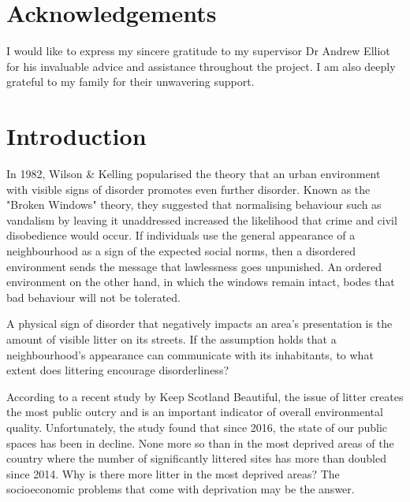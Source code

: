 \documentclass{thesis}
\begin{document}
\chapter*{Acknowledgements}

I would like to express my sincere gratitude to my supervisor Dr Andrew Elliot for his invaluable advice and assistance throughout the project. I am also deeply grateful to my family for their unwavering support.


\listoffigures
\listoftables


\tableofcontents


\chapter{Introduction}

In 1982, Wilson \& Kelling popularised the theory that an urban environment with visible signs of disorder promotes even further disorder. Known as the "Broken Windows" theory, they suggested that normalising behaviour such as vandalism by leaving it unaddressed increased the likelihood that crime and civil disobedience would occur\cite{broken-windows}. If individuals use the  general appearance of a neighbourhood as a sign of the expected social norms, then a disordered environment sends the message that lawlessness goes unpunished. An ordered environment on the other hand, in which the windows remain intact, bodes that bad behaviour will not be tolerated.

A physical sign of disorder that negatively impacts an area's presentation is the amount of visible litter on its streets. If the assumption holds that a neighbourhood's appearance can communicate with its inhabitants, to what extent does littering encourage disorderliness?

According to a recent study by Keep Scotland Beautiful, the issue of litter creates the most public outcry and is an important indicator of overall environmental quality\cite{household-survey-2019}. Unfortunately, the study found that since 2016, the state of our public spaces has been in decline. None more so than in the most deprived areas of the country where the number of significantly littered sites has more than doubled since 2014. Why is there more litter in the most deprived areas? The socioeconomic problems that come with deprivation may be the answer.
\end{document}
